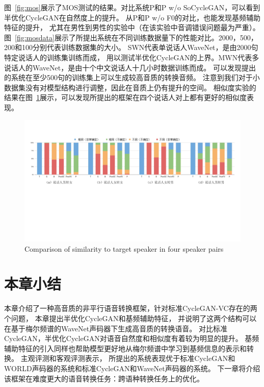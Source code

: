 图~\ref{fig:mos}展示了MOS测试的结果。对比系统P和P w/o SoCycleGAN，可以看到半优化CycleGAN在自然度上的提升。
从P和P w/o F0的对比，也能发现基频辅助特征的提升，
尤其在男性到男性的实验中（在该实验中音调错误问题最为严重）。
图~\ref{fig:mosdata}展示了所提出系统在不同训练数据量下的性能对比。2000，500，200和100分别代表训练数据集的大小。
SWN代表单说话人WaveNet，是由2000句特定说话人的训练集训练而成，
用以测试半优化CycleGAN的上界。MWN代表多说话人的WaveNet，是由十个中文说话人十几小时数据训练而成。
可以发现提出的系统在至少500句的训练集上可以生成较高音质的转换音频。
注意到我们对于小数据集没有对模型结构进行调整，因此在音质上仍有提升的空间。
相似度实验的结果在图~\ref{fig:sim}展示，可以发现所提出的框架在四个说话人对上都有更好的相似度表现。


\begin{figure}[!htp]
    \centering
    \includegraphics[width=14cm,trim=25 250 40 60,clip]{figure/4_sim.png}
    {Comparison of similarity to target speaker in four speaker pairs}
    \label{fig:sim}
\end{figure}

\section{本章小结}

本章介绍了一种高音质的非平行语音转换框架，针对标准CycleGAN-VC存在的两个问题，
本章提出半优化CycleGAN和基频辅助特征，
并说明了这两个结构可以在基于梅尔频谱的WaveNet声码器下生成高音质的转换语音。
对比标准CycleGAN，半优化CycleGAN对语音自然度和相似度有着较为明显的提升。
基频辅助特征的引入同样也帮助模型更好地从梅尔频谱中学习到基频信息的表示和转换。
主观评测和客观评测表示，
所提出的系统表现优于标准CycleGAN和WORLD声码器的系统和标准CycleGAN和WaveNet声码器的系统。
下一章将介绍该框架在难度更大的语音转换任务：跨语种转换任务上的优化。

